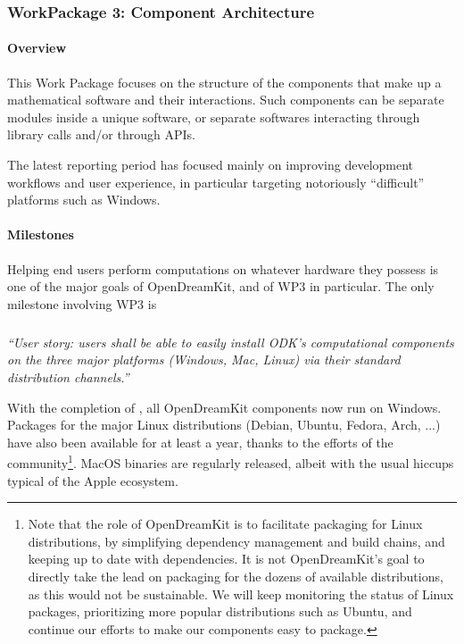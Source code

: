   \subsubsection{WorkPackage 3:  Component Architecture}

\paragraph{Overview}

This Work Package focuses on the structure of the components that make
up a mathematical software and their interactions. Such components can
be separate modules inside a unique software, or separate softwares
interacting through library calls and/or through APIs.

The latest reporting period has focused mainly on improving
development workflows and user experience, in particular targeting
notoriously ``difficult'' platforms such as Windows.

\paragraph{Milestones} Helping end users perform computations on
whatever hardware they possess is one of the major goals of
OpenDreamKit, and of WP3 in particular. The only milestone involving
WP3 is

\subparagraph{}

\emph{“User story: users shall be able to easily install ODK's
    computational components on the three major platforms (Windows,
    Mac, Linux) via their standard distribution channels.”}

  With the completion of
  , all
  OpenDreamKit components now run on Windows. Packages for the major
  Linux distributions (Debian, Ubuntu, Fedora, Arch, ...) have also
  been available for at least a year, thanks to the efforts of the
  community\footnote{Note that the role of OpenDreamKit is to
    facilitate packaging for Linux distributions, by simplifying
    dependency management and build chains, and keeping up to date
    with dependencies. It is not OpenDreamKit's goal to directly take
    the lead on packaging for the dozens of available distributions,
    as this would not be sustainable. We will keep monitoring the
    status of Linux packages, prioritizing more popular distributions
    such as Ubuntu, and continue our efforts to make our components
    easy to package.}. MacOS binaries are regularly released, albeit
  with the usual hiccups typical of the Apple ecosystem.

